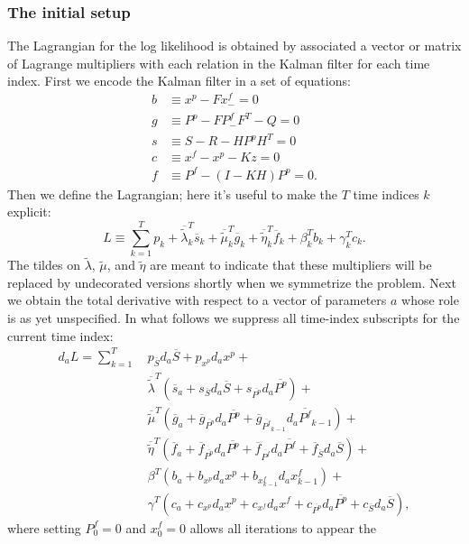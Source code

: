 \documentclass[10pt,fleqn]{article}
\renewcommand{\vec}[1]{\ensuremath{\overline{#1}}}
\begin{document}
\subsubsection{The initial setup} \label{sec:setup}
The Lagrangian for the log likelihood is obtained by associated a vector or
matrix of Lagrange multipliers with each relation in the Kalman filter for each
time index. First we encode the Kalman filter in a set of equations:
\begin{align*}
  b &\equiv x^p - F x^f_- = 0 \\
  g &\equiv P^p - F P^f_- F^T - Q = 0 \\
  s &\equiv S - R - H P^p H^T = 0 \\
  c &\equiv x^f - x^p - K z = 0 \\
  f &\equiv P^f - (I - K H) P^p = 0.
\end{align*}
Then we define the Lagrangian; here it's useful to make the $T$ time indices $k$
explicit:
\begin{equation*}
  L \equiv \sum_{k = 1}^T p_k + \vec{\tilde\lambda}_k^T \vec s_k +
  \vec{\tilde\mu}_k^T \vec g_k + \vec{\tilde\eta}_k^T \vec f_k + \beta_k^T b_k +
  \gamma_k^T c_k.
\end{equation*}
The tildes on $\tilde\lambda$, $\tilde\mu$, and $\tilde\eta$ are meant to
indicate that these multipliers will be replaced by undecorated versions shortly
when we symmetrize the problem. Next we obtain the total derivative with respect
to a vector of parameters $a$ whose role is as yet unspecified. In what follows
we suppress all time-index subscripts for the current time index:
\begin{align*}
  d_a L = \sum_{k = 1}^T \ & p_{\vec S} d_a \vec S + p_{x^p} d_a x^p + \\
  & \vec{\tilde\lambda}^T (\vec s_a + s_{\vec S} d_a \vec S +
    s_{\vec{P^p}} d_a \vec{P^p}) + \\
  & \vec{\tilde\mu}^T (\vec g_a + \vec g_{\vec{P^p}} d_a \vec{P^p} +
    \vec g_{\vec{P^f}_{k-1}} d_a \vec{P^f}_{k-1}) + \\
  & \vec{\tilde\eta}^T (\vec f_a + \vec f_{\vec{P^p}} d_a \vec{P^p} +
    \vec f_{\vec{P^f}} d_a \vec{P^f} + \vec f_{\vec S} d_a \vec S ) + \\
  & \beta^T (b_a + b_{x^p} d_a x^p + b_{x^f_{k-1}} d_a x^f_{k-1}) + \\
  & \gamma^T (c_a + c_{x^p} d_a x^p + c_{x^f} d_a x^f +
    c_{\vec{P^p}} d_a \vec{P^p} + c_{\vec S} d_a \vec S),
\end{align*}
where setting $P^f_0 = 0$ and $x^f_0 = 0$ allows all iterations to appear the
\end{document}
